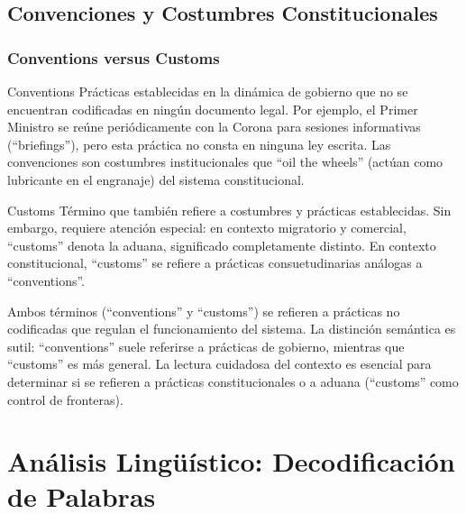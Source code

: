 \documentclass[12pt,oneside]{book}
\begin{document}
\section{Convenciones y Costumbres Constitucionales}

\subsection{Conventions versus Customs}

\begin{definition}{Conventions}
Prácticas establecidas en la dinámica de gobierno que no se encuentran codificadas en ningún documento legal. Por ejemplo, el Primer Ministro se reúne periódicamente con la Corona para sesiones informativas (``briefings''), pero esta práctica no consta en ninguna ley escrita. Las convenciones son costumbres institucionales que ``oil the wheels'' (actúan como lubricante en el engranaje) del sistema constitucional.
\end{definition}

\begin{definition}{Customs}
Término que también refiere a costumbres y prácticas establecidas. Sin embargo, requiere atención especial: en contexto migratorio y comercial, ``customs'' denota la aduana, significado completamente distinto. En contexto constitucional, ``customs'' se refiere a prácticas consuetudinarias análogas a ``conventions''.
\end{definition}

\begin{note}
Ambos términos (``conventions'' y ``customs'') se refieren a prácticas no codificadas que regulan el funcionamiento del sistema. La distinción semántica es sutil: ``conventions'' suele referirse a prácticas de gobierno, mientras que ``customs'' es más general. La lectura cuidadosa del contexto es esencial para determinar si se refieren a prácticas constitucionales o a aduana (``customs'' como control de fronteras).
\end{note}


\chapter{Análisis Lingüístico: Decodificación de Palabras}
\end{document}
